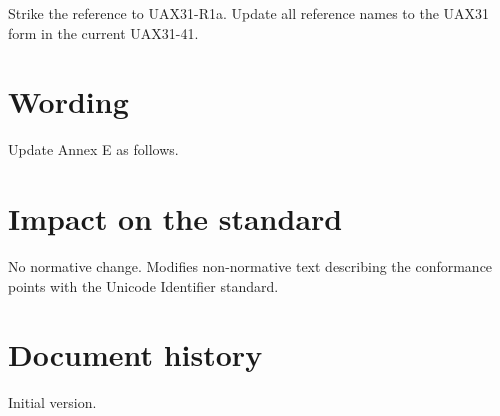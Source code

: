 \documentclass[a4paper,10pt,oneside,openany,final,article]{memoir}
\begin{document}
Strike the reference to UAX31-R1a. Update all reference names to the UAX31 form in the current UAX31-41.

\chapter{Wording}

Update Annex E as follows.

\begin{wording}



\end{wording}

\chapter{Impact on the standard}

No normative change. Modifies non-normative text describing the conformance points with the Unicode Identifier standard.

\chapter*{Document history}
Initial version.
\end{document}
